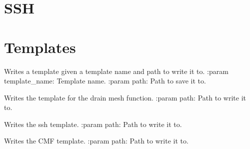 \documentclass[letterpaper,10pt,english]{sphinxmanual}
\begin{document}
\section{SSH}
\label{\detokenize{lib:module-livestock.lib.ssh}}\label{\detokenize{lib:ssh}}

\section{Templates}
\label{\detokenize{lib:module-livestock.lib.templates}}\label{\detokenize{lib:templates}}

\begin{fulllineitems}
\label{\detokenize{lib:livestock.lib.templates.pick_template}}
Writes a template given a template name and path to write it to.
:param template\_name: Template name.
:param path: Path to save it to.

\end{fulllineitems}


\begin{fulllineitems}
\label{\detokenize{lib:livestock.lib.templates.drain_mesh_template}}
Writes the template for the drain mesh function.
:param path: Path to write it to.

\end{fulllineitems}


\begin{fulllineitems}
\label{\detokenize{lib:livestock.lib.templates.ssh_template}}
Writes the ssh template.
:param path: Path to write it to.

\end{fulllineitems}


\begin{fulllineitems}
\label{\detokenize{lib:livestock.lib.templates.cmf_template}}
Writes the CMF template.
:param path: Path to write it to.

\end{fulllineitems}
\end{document}
